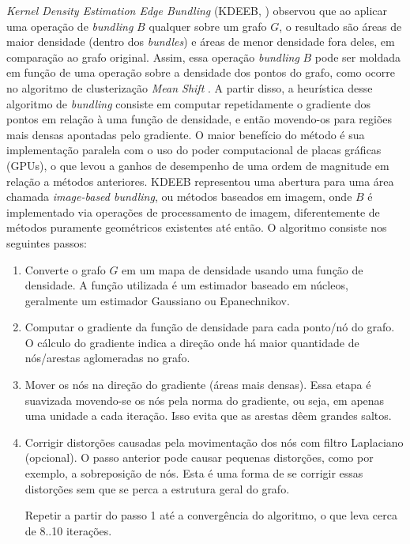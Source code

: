 \emph{Kernel Density Estimation Edge Bundling} (KDEEB, \citet{Hurter2012})
observou que ao aplicar uma operação de \emph{bundling} $B$ qualquer sobre um
grafo $G$, o resultado são áreas de maior densidade (dentro dos \emph{bundles})
e áreas de menor densidade fora deles, em comparação ao grafo original. Assim,
essa operação \emph{bundling} $B$ pode ser moldada em função de uma operação
sobre a densidade dos pontos do grafo, como ocorre no algoritmo de
clusterização \emph{Mean Shift} \citep{CM02}.  A partir disso, a heurística
desse algoritmo de \emph{bundling} consiste em computar repetidamente o
gradiente dos pontos em relação à uma função de densidade, e então movendo-os
para regiões mais densas apontadas pelo gradiente. O maior benefício do método
é sua implementação paralela com o uso do poder computacional de placas
gráficas (GPUs), o que levou a ganhos de desempenho de uma ordem de magnitude
em relação a métodos anteriores. KDEEB representou uma abertura para uma área
chamada \emph{image-based bundling}, ou métodos baseados em imagem, onde $B$ é
implementado via operações de processamento de imagem, diferentemente de
métodos puramente geométricos existentes até então. O algoritmo consiste nos
seguintes passos:

\begin{enumerate}
  \item Converte o grafo $G$ em um mapa de densidade usando uma função de
densidade. A função utilizada é um estimador baseado em núcleos, geralmente um
estimador Gaussiano ou Epanechnikov.

  \item Computar o gradiente da função de densidade para cada ponto/nó do
grafo. O cálculo do gradiente indica a direção onde há maior quantidade
de nós/arestas aglomeradas no grafo.

  \item Mover os nós na direção do gradiente (áreas mais densas). Essa etapa é
suavizada movendo-se os nós pela norma do gradiente, ou seja, em apenas uma unidade
a cada iteração. Isso evita que as arestas dêem grandes saltos.

  \item Corrigir distorções causadas pela movimentação dos nós com filtro
Laplaciano (opcional).  O passo anterior pode causar pequenas distorções, como
por exemplo, a sobreposição de nós. Esta é uma forma de se corrigir essas
distorções sem que se perca a estrutura geral do grafo.

  Repetir a partir do passo 1 até a convergência do algoritmo, o que leva cerca de 8..10
iterações.
\end{enumerate}

